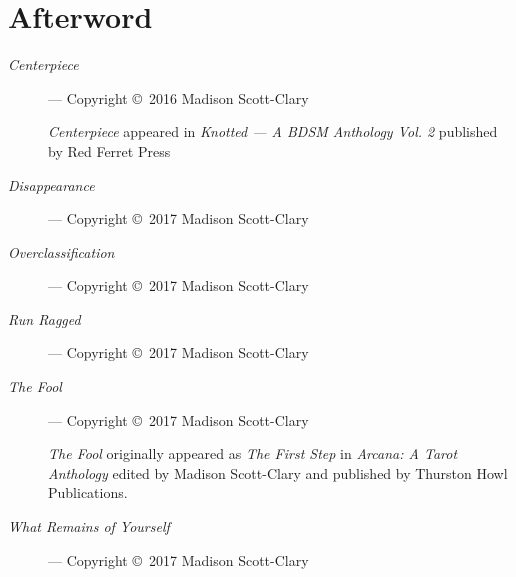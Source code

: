 \chapter*{Afterword}\label{afterword}

\begin{description}
  \item[\emph{Centerpiece}] --- Copyright \copyright\ 2016 Madison Scott-Clary

  \emph{Centerpiece} appeared in \emph{Knotted --- A BDSM Anthology Vol. 2} published by Red Ferret Press
  \item[\emph{Disappearance}] --- Copyright \copyright\ 2017 Madison Scott-Clary
  \item[\emph{Overclassification}] --- Copyright \copyright\ 2017 Madison Scott-Clary
  \item[\emph{Run Ragged}] --- Copyright \copyright\ 2017 Madison Scott-Clary
  \item[\emph{The Fool}] --- Copyright \copyright\ 2017 Madison Scott-Clary

  \emph{The Fool} originally appeared as \emph{The First Step} in \emph{Arcana: A Tarot Anthology} edited by Madison Scott-Clary and published by Thurston Howl Publications.
  \item[\emph{What Remains of Yourself}] --- Copyright \copyright\ 2017 Madison Scott-Clary
\end{description}

